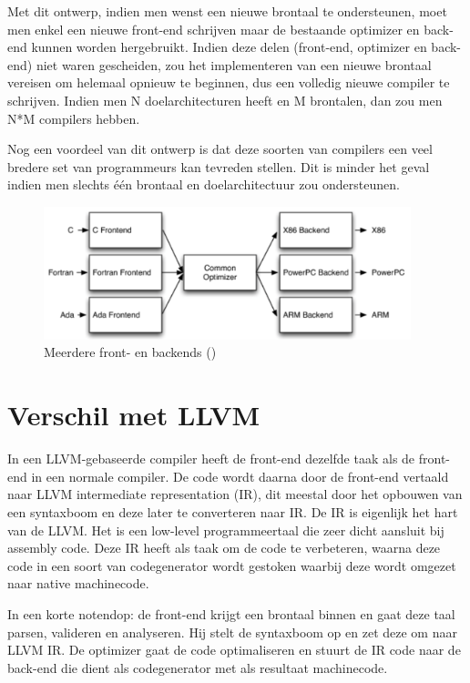 Met dit ontwerp, indien men wenst een nieuwe brontaal te ondersteunen, moet men enkel een nieuwe front-end schrijven maar de bestaande optimizer en back-end kunnen worden hergebruikt. Indien deze delen (front-end, optimizer en back-end) niet waren gescheiden, zou het implementeren van een nieuwe brontaal vereisen om helemaal opnieuw te beginnen, dus een volledig nieuwe compiler te schrijven. Indien men N doelarchitecturen heeft en M brontalen, dan zou men N*M compilers hebben.

Nog een voordeel van dit ontwerp is dat deze soorten van compilers een veel bredere set van programmeurs kan tevreden stellen. Dit is minder het geval indien men slechts één brontaal en doelarchitectuur zou ondersteunen. 

\begin{figure} [ht]
	\centering
	\includegraphics[width=0.95\textwidth]{img/llvmdriefasen}
	\caption{Meerdere front- en backends (\cite{aosa})}
	\label{fig:llvmdriefasen}
\end{figure}

\section{Verschil met LLVM}
\label{sec:difference-llvm}
In een LLVM-gebaseerde compiler heeft de front-end dezelfde taak als de front-end in een normale compiler. De code wordt daarna door de front-end vertaald naar LLVM intermediate representation (IR), dit meestal door het opbouwen van een syntaxboom en deze later te converteren naar IR. De IR is eigenlijk het hart van de LLVM. Het is een low-level programmeertaal die zeer dicht aansluit bij assembly code. Deze IR heeft als taak om de code te verbeteren, waarna deze code in een soort van codegenerator wordt gestoken waarbij deze wordt omgezet naar native machinecode. 

In een korte notendop: de front-end krijgt een brontaal binnen en gaat deze taal parsen, valideren en analyseren. Hij stelt de syntaxboom op en zet deze om naar LLVM IR. De optimizer gaat de code optimaliseren en stuurt de IR code naar de back-end die dient als codegenerator met als resultaat machinecode.

